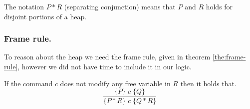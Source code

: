 \begin{defn}
The notation $P * R$ (separating conjunction) means that $P$ and $R$ holds for disjoint portions of a heap.
\end{defn}

\subsubsection{Frame rule.}
To reason about the heap we need the frame rule, given in theorem \ref{the:frame-rule}, however we did not have time to include it in our logic.

\begin{theorem}\label{the:frame-rule}
If the command $c$ does not modify any free variable in $R$ then it holds that.
\begin{equation}
\frac
{\{P\}\;c\;\{Q\}}
{\{P * R\}\; c \; \{Q * R\}}
\end{equation}
\end{theorem}
